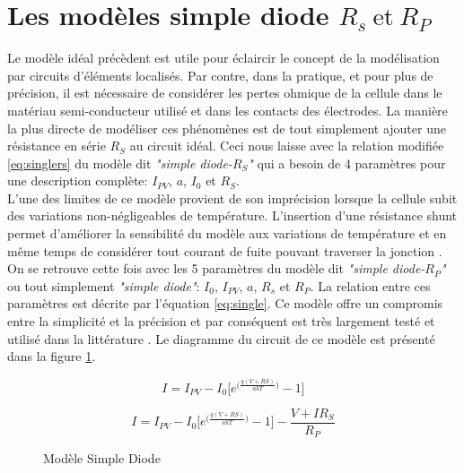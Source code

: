 \section{Les modèles simple diode \texorpdfstring{$R_s\ \text{et}\ R_P$}{Rs et Rp}}
Le modèle idéal précèdent est utile pour éclaircir le concept de la modélisation par circuits d'éléments localisés. Par contre, dans la pratique, et pour plus de précision, il est nécessaire de considérer les pertes ohmique de la cellule dans le matériau semi-conducteur utilisé et dans les contacts des électrodes. La manière la plus directe de modéliser ces phénomènes est de tout simplement ajouter une résistance en série $R_S$ au circuit idéal. Ceci nous laisse avec la relation modifiée \ref{eq:singlers} du modèle dit \textit{"simple diode-$R_S$"} qui a besoin de 4 paramètres pour une description complète: $I_{PV}$, $a$, $I_0$ et $R_S$.\\
L'une des limites de ce modèle provient de son imprécision lorsque la cellule subit des variations non-négligeables de température. L'insertion d'une résistance shunt permet d'améliorer la sensibilité du modèle aux variations de température et en même temps de considérer tout courant de fuite pouvant traverser la jonction \cite{Chin2015b}. On se retrouve cette fois avec les 5 paramètres du modèle dit \textit{"simple diode-$R_P$"} ou tout simplement \textit{"simple diode"}: $I_0$, $I_{PV}$, $a$, $R_s$ et $R_P$. La relation entre ces paramètres est décrite par l'équation \ref{eq:single}. Ce modèle offre un compromis entre la simplicité et la précision et par conséquent est très largement testé et utilisé dans la littérature \cite{Carrero2007}. Le diagramme du circuit de ce modèle est présenté dans la figure \ref{fig:single}.

\begin{equation}
  \label{eq:singlers}
  I = I_{PV} - I_0 \bigg[e^{\big(\frac{q(V + RS)}{akT}\big)} - 1\bigg]
\end{equation}

\begin{equation}
  \label{eq:single}
  I = I_{PV} - I_0 \bigg[e^{\big(\frac{q(V + RS)}{akT}\big)} - 1\bigg] - \frac{V + I R_S}{R_P}
\end{equation}

\begin{figure}
  \begin{center}
    \shorthandoff{:!}
    \shorthandon{:!}
    \caption{Modèle Simple Diode}
    \label{fig:single}
  \end{center}
\end{figure}



